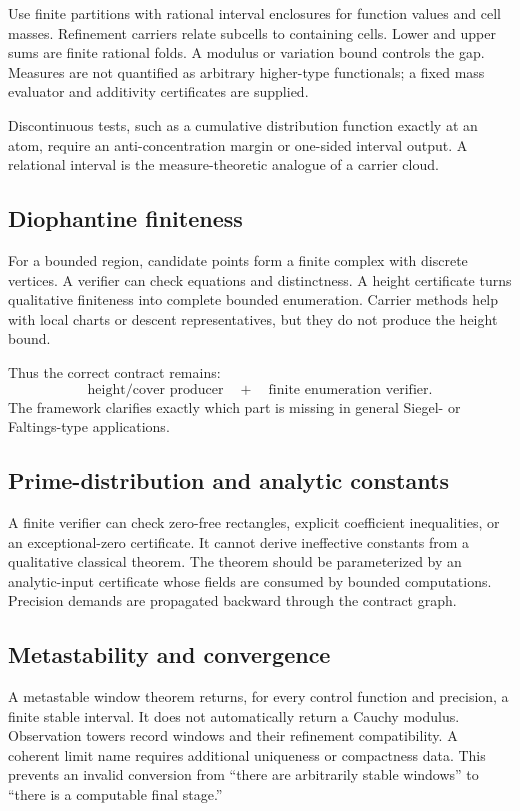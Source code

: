 Use finite partitions with rational interval enclosures for function values and cell masses.  Refinement carriers relate subcells to containing cells.  Lower and upper sums are finite rational folds.  A modulus or variation bound controls the gap.  Measures are not quantified as arbitrary higher-type functionals; a fixed mass evaluator and additivity certificates are supplied.

Discontinuous tests, such as a cumulative distribution function exactly at an atom, require an anti-concentration margin or one-sided interval output.  A relational interval is the measure-theoretic analogue of a carrier cloud.

\subsection{Diophantine finiteness}

For a bounded region, candidate points form a finite complex with discrete vertices.  A verifier can check equations and distinctness.  A height certificate turns qualitative finiteness into complete bounded enumeration.  Carrier methods help with local charts or descent representatives, but they do not produce the height bound.

Thus the correct contract remains:
\[
  \text{height/cover producer}
  \quad+\quad
  \text{finite enumeration verifier}.
\]
The framework clarifies exactly which part is missing in general Siegel- or Faltings-type applications.

\subsection{Prime-distribution and analytic constants}

A finite verifier can check zero-free rectangles, explicit coefficient inequalities, or an exceptional-zero certificate.  It cannot derive ineffective constants from a qualitative classical theorem.  The theorem should be parameterized by an analytic-input certificate whose fields are consumed by bounded computations.  Precision demands are propagated backward through the contract graph.

\subsection{Metastability and convergence}

A metastable window theorem returns, for every control function and precision, a finite stable interval.  It does not automatically return a Cauchy modulus.  Observation towers record windows and their refinement compatibility.  A coherent limit name requires additional uniqueness or compactness data.  This prevents an invalid conversion from ``there are arbitrarily stable windows'' to ``there is a computable final stage.''

